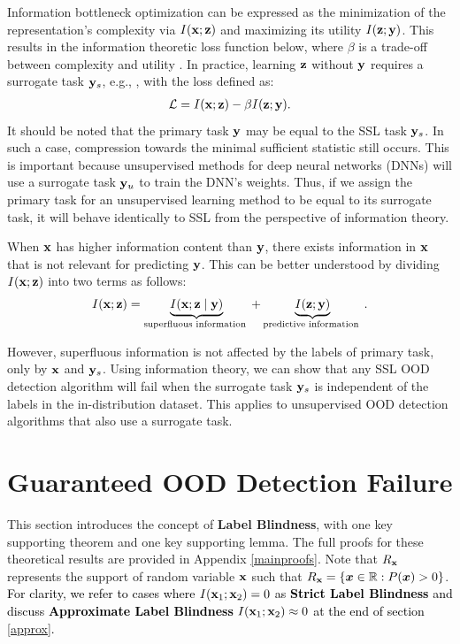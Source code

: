 \documentclass{article} %
\theoremstyle{plain}
\theoremstyle{definition}
\theoremstyle{remark}
\begin{document}
Information bottleneck optimization can be expressed as the minimization of the representation's complexity via $I({\mathbf{x}};{\mathbf{z}})$ and maximizing its utility $I({\mathbf{z}};{\mathbf{y}})$. This results in the information theoretic loss function below, where $\beta$ is a trade-off between complexity and utility \citep{shwartz2023compress}. In practice, learning ${\mathbf{z}}$ without ${\mathbf{y}}$ requires a surrogate task ${\mathbf{y}}_{s}$, e.g., \citep{chen2020simple}, with the loss defined as:
\begin{align}
\mathcal{L}=I({\mathbf{x}} ; {\mathbf{z}})-\beta I({\mathbf{z}} ;{\mathbf{y}}).
\end{align}
It should be noted that the primary task ${\mathbf{y}}$ may be equal to the SSL task ${\mathbf{y}}_{s}$. In such a case, compression towards the minimal sufficient statistic still occurs. This is important because unsupervised methods for deep neural networks (DNNs) will use a surrogate task ${\mathbf{y}}_{u}$ to train the DNN's weights. Thus, if we assign the primary task for an unsupervised learning method to be equal to its surrogate task, it will behave identically to SSL from the perspective of information theory.

When ${\mathbf{x}}$ has higher information content than ${\mathbf{y}}$, there exists information in ${\mathbf{x}}$ that is not relevant for predicting ${\mathbf{y}}$. This can be better understood by dividing $I({\mathbf{x}};{\mathbf{z}})$ into two terms \citep{federici2020learning} as follows:
\begin{align}
I({\mathbf{x}} ; {\mathbf{z}})=\underbrace{I({\mathbf{x}} ;{\mathbf{z}} \mid {\mathbf{y}})}_{\text {superfluous information }}+\underbrace{I({\mathbf{z}} ; {\mathbf{y}})}_{\text {predictive information }}. \label{superfluous}
\end{align}

However, superfluous information is not affected by the labels of primary task, only by ${\mathbf{x}}$ and ${\mathbf{y}}_{s}$. Using information theory, we can show that any SSL OOD detection algorithm will fail when the surrogate task ${\mathbf{y}}_{s}$ is independent of the labels in the in-distribution dataset. This applies to unsupervised OOD detection algorithms that also use a surrogate task.



\vspace{-2mm}\section{Guaranteed OOD Detection Failure}\vspace{-2mm}
This section introduces the concept of \textbf{Label Blindness}, with one key supporting theorem and one key supporting lemma. The full proofs for these theoretical results are provided in Appendix \ref{mainproofs}. Note that $R_{{\mathbf{x}}}$ represents the support of random variable ${\mathbf{x}}$ such that $R_{{\mathbf{x}}} = \{{\bm{x}} \in \mathbb{R} : P({\bm{x}}) > 0\}$. \textcolor{black}{For clarity, we refer to cases where $I({\mathbf{x}}_1; {\mathbf{x}}_2) = 0$ as \textbf{Strict Label Blindness} and discuss \textbf{Approximate Label Blindness} $I({\mathbf{x}}_1; {\mathbf{x}}_2) \approx 0$  at the end of section \ref{approx}.}
\end{document}
